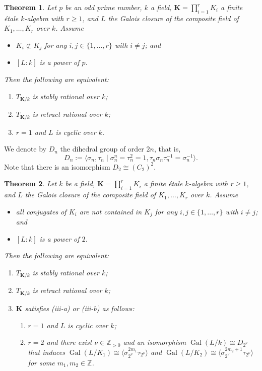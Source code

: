 \documentclass[12pt]{amsart}
\theoremstyle{plain}
\newtheorem{thm}{Theorem}[section]
\theoremstyle{definition}
\numberwithin{thm}{section}
\numberwithin{equation}{section}
\newcommand{\Zpn}{\mathbb{Z}_{>0}}
\newcommand{\Z}{\mathbb{Z}}
\newcommand{\bK}{\mathbf{K}}
\DeclareMathOperator{\Gal}{Gal}
\begin{document}
\begin{thm}\label{mth1}
Let $p$ be an odd prime number, $k$ a field, $\bK=\prod_{i=1}^{r}K_{i}$ a finite {\'e}tale $k$-algebra with $r \geq 1$, 
and $L$ the Galois closure of the composite field of $K_{1}, \ldots, K_{r}$ over $k$.
Assume
\begin{itemize}
    \item $K_{i}\not\subset K_{j}$ for any $i,j \in \{1,\ldots,r\}$ with $i\neq j$; and
    \item $[L:k]$ is a power of $p$. 
\end{itemize}
Then the following are equivalent: 
\begin{enumerate}
\item $T_{\bK/k}$ is stably rational over $k$; 
\item $T_{\bK/k}$ is retract rational over $k$; 
\item $r=1$ and $L$ is cyclic over $k$. 
\end{enumerate}
\end{thm}

We denote by $D_{n}$ the dihedral group of order $2n$, that is, 
\begin{equation*}
    D_{n}:=\langle \sigma_{n},\tau_{n}\mid \sigma_{n}^{n}=\tau_{n}^{2}=1,\tau_{n}\sigma_{n}\tau_{n}^{-1}=\sigma_{n}^{-1}\rangle. 
\end{equation*}
Note that there is an isomorphism $D_{2}\cong (C_{2})^{2}$. 

\begin{thm}\label{mth2}
Let $k$ be a field, $\bK=\prod_{i=1}^{r}K_{i}$ a finite {\'e}tale $k$-algebra with $r \geq 1$, 
and $L$ the Galois closure of the composite field of $K_{1}, \ldots, K_{r}$ over $k$.
Assume
\begin{itemize}
    \item all conjugates of $K_{i}$ are not contained in $K_{j}$ for any $i,j \in \{1,\ldots,r\}$ with $i\neq j$; and 
    \item $[L:k]$ is a power of $2$.
\end{itemize}
Then the following are equivalent: 
\begin{enumerate}
\item $T_{\bK/k}$ is stably rational over $k$; 
\item $T_{\bK/k}$ is retract rational over $k$; 
\item $\bK$ satisfies \emph{(iii-a)} or \emph{(iii-b)} as follows:
\begin{enumerate}
\item[(iii-a)] $r=1$ and $L$ is cyclic over $k$; 
\item[(iii-b)] $r=2$ and there exist $\nu \in \Zpn$ and an isomorphism $\Gal(L/k)\cong D_{2^{\nu}}$ that induces $\Gal(L/K_{1})\cong \langle \sigma_{2^{\nu}}^{2m_{1}}\tau_{2^{\nu}}\rangle$ and $\Gal(L/K_{2})\cong \langle \sigma_{2^{\nu}}^{2m_{2}+1}\tau_{2^{\nu}}\rangle$ for some $m_{1},m_{2}\in \Z$.
\end{enumerate}
\end{enumerate}
\end{thm}
\end{document}
